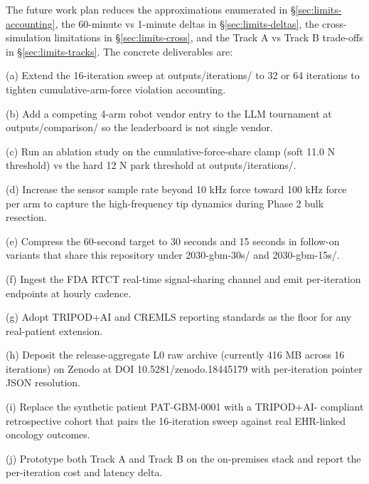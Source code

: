 The future work plan reduces the approximations enumerated in
\S\ref{sec:limits-accounting}, the 60-minute vs 1-minute deltas in
\S\ref{sec:limits-deltas}, the cross-simulation limitations in
\S\ref{sec:limits-cross}, and the Track A vs Track B trade-offs in
\S\ref{sec:limits-tracks}. The concrete deliverables are:

(a) Extend the 16-iteration sweep at outputs/iterations/ to 32 or
64 iterations to tighten cumulative-arm-force violation accounting.

(b) Add a competing 4-arm robot vendor entry to the LLM tournament
at outputs/comparison/ so the leaderboard is not single vendor.

(c) Run an ablation study on the cumulative-force-share clamp (soft
11.0 N threshold) vs the hard 12 N park threshold at
outputs/iterations/.

(d) Increase the sensor sample rate beyond 10 kHz force toward 100
kHz force per arm to capture the high-frequency tip dynamics during
Phase 2 bulk resection.

(e) Compress the 60-second target to 30 seconds and 15 seconds in
follow-on variants that share this repository under 2030-gbm-30s/
and 2030-gbm-15s/.


(f) Ingest the FDA RTCT real-time signal-sharing channel
\cite{fda2026realtime} and emit per-iteration endpoints at hourly
cadence.

(g) Adopt TRIPOD+AI and CREMLS reporting standards
\cite{Collins2024TRIPODAI, ElEmam2024CREMLS} as the floor for any
real-patient extension.

(h) Deposit the release-aggregate L0 raw archive (currently 416 MB
across 16 iterations) on Zenodo \cite{zenodo} at DOI
10.5281/zenodo.18445179 with per-iteration pointer JSON resolution.

(i) Replace the synthetic patient PAT-GBM-0001 with a TRIPOD+AI-
compliant retrospective cohort that pairs the 16-iteration sweep
against real EHR-linked oncology outcomes.

(j) Prototype both Track A and Track B on the on-premises stack and
report the per-iteration cost and latency delta.
